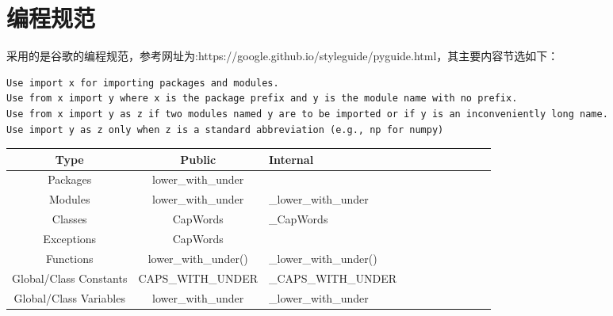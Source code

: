 \documentclass{article}
\begin{document}
\section{编程规范}
\large 
采用的是谷歌的编程规范，参考网址为:https://google.github.io/styleguide/pyguide.html，其主要内容节选如下：
\begin{lstlisting}
Use import x for importing packages and modules.
Use from x import y where x is the package prefix and y is the module name with no prefix.
Use from x import y as z if two modules named y are to be imported or if y is an inconveniently long name.
Use import y as z only when z is a standard abbreviation (e.g., np for numpy) 
\end{lstlisting}

\begin{table}[!htbp]
   \centering
   \begin{tabular}{ccccccccccc}
   \toprule  
\textcolor[rgb]{0.141, 0.161, 0.180}{Type} & \textcolor[rgb]{0.141, 0.161, 0.180}{Public} & \multicolumn{1}{l}{\textcolor[rgb]{0.141, 0.161, 0.180}{Internal}} \\
\midrule
\textcolor[rgb]{0.141, 0.161, 0.180}{Packages} & \textcolor[rgb]{0.141, 0.161, 0.180}{lower\_with\_under} & \textcolor[rgb]{0.141, 0.161, 0.180}{} \\
\textcolor[rgb]{0.141, 0.161, 0.180}{Modules} & \textcolor[rgb]{0.141, 0.161, 0.180}{lower\_with\_under} & \multicolumn{1}{l}{\textcolor[rgb]{0.141, 0.161, 0.180}{\_lower\_with\_under}} \\
\textcolor[rgb]{0.141, 0.161, 0.180}{Classes} & \textcolor[rgb]{0.141, 0.161, 0.180}{CapWords} & \multicolumn{1}{l}{\textcolor[rgb]{0.141, 0.161, 0.180}{\_CapWords}} \\
\textcolor[rgb]{0.141, 0.161, 0.180}{Exceptions} & \textcolor[rgb]{0.141, 0.161, 0.180}{CapWords} & \textcolor[rgb]{0.141, 0.161, 0.180}{} \\
\textcolor[rgb]{0.141, 0.161, 0.180}{Functions} & \textcolor[rgb]{0.141, 0.161, 0.180}{lower\_with\_under()} & \multicolumn{1}{l}{\textcolor[rgb]{0.141, 0.161, 0.180}{\_lower\_with\_under()}} \\
\textcolor[rgb]{0.141, 0.161, 0.180}{Global/Class Constants} & \textcolor[rgb]{0.141, 0.161, 0.180}{CAPS\_WITH\_UNDER} & \multicolumn{1}{l}{\textcolor[rgb]{0.141, 0.161, 0.180}{\_CAPS\_WITH\_UNDER}} \\
\textcolor[rgb]{0.141, 0.161, 0.180}{Global/Class Variables} & \textcolor[rgb]{0.141, 0.161, 0.180}{lower\_with\_under} & \multicolumn{1}{l}{\textcolor[rgb]{0.141, 0.161, 0.180}{\_lower\_with\_under}} \\

\end{tabular}
\end{table}
\end{document}
